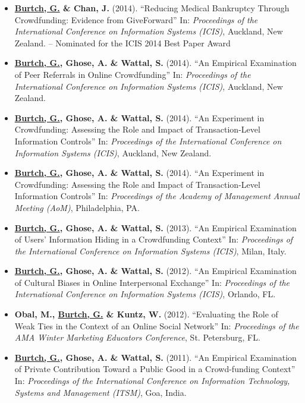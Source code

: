 \documentclass[10.5pt,letterpaper,sans]{moderncv}        %
\begin{document}
\begin{itemize}
\item \textbf{\underline{Burtch, G.} \& Chan, J.} (2014). ``Reducing Medical Bankruptcy Through Crowdfunding: Evidence from GiveForward'' In: \textit{Proceedings of the International Conference on Information Systems (ICIS)}, Auckland, New Zealand. \newline-- Nominated for the ICIS 2014 Best Paper Award

\item \textbf{\underline{Burtch, G.}, Ghose, A. \& Wattal, S.} (2014). ``An Empirical Examination of Peer Referrals in Online Crowdfunding'' In: \textit{Proceedings of the International Conference on Information Systems (ICIS)}, Auckland, New Zealand.

\item \textbf{\underline{Burtch, G.}, Ghose, A. \& Wattal, S.} (2014). ``An Experiment in Crowdfunding: Assessing the Role and Impact of Transaction-Level Information Controls'' In: \textit{Proceedings of the International Conference on Information Systems (ICIS)}, Auckland, New Zealand.

\item \textbf{\underline{Burtch, G.}, Ghose, A. \& Wattal, S.} (2014). ``An Experiment in Crowdfunding: Assessing the Role and Impact of Transaction-Level Information Controls'' In: \textit{Proceedings of the Academy of Management Annual Meeting (AoM)}, Philadelphia, PA.

\item \textbf{\underline{Burtch, G.}, Ghose, A. \& Wattal, S.} (2013). ``An Empirical Examination of Users' Information Hiding in a Crowdfunding Context'' In: \textit{Proceedings of the International Conference on Information Systems (ICIS)}, Milan, Italy.

\item \textbf{\underline{Burtch, G.}, Ghose, A. \& Wattal, S.} (2012). ``An Empirical Examination of Cultural Biases in Online Interpersonal Exchange'' In: \textit{Proceedings of the International Conference on Information Systems (ICIS)}, Orlando, FL.

\item \textbf{Obal, M., \underline{Burtch, G.} \& Kuntz, W.} (2012). ``Evaluating the Role of Weak Ties in the Context of an Online Social Network'' In: \textit{Proceedings of the AMA Winter Marketing Educators Conference}, St. Petersburg, FL.

\item \textbf{\underline{Burtch, G.}, Ghose, A. \& Wattal, S.} (2011). ``An Empirical Examination of Private Contribution Toward a Public Good in a Crowd-funding Context'' In: \textit{Proceedings of the International Conference on Information Technology, Systems and Management (ITSM)}, Goa, India.


\end{itemize}
\end{document}
